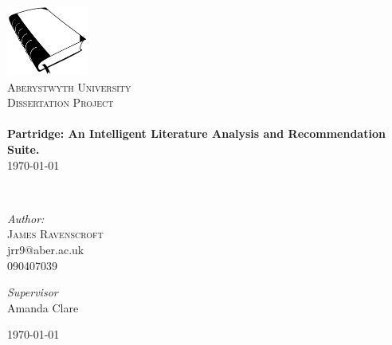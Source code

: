 \begin{titlepage}
 
\begin{center}
 
\includegraphics[width=0.20\textwidth]{../cover_logo.png}\\[1cm]
 
\textsc{\LARGE Aberystwyth University}\\[1.5cm]
 
\textsc{\LARGE Dissertation Project}\\[0.5cm]
 
 
\HRule \\[0.4cm]
{ \huge \bfseries Partridge: An Intelligent Literature Analysis and
Recommendation Suite.}\\[0.4cm]

\today
 
\HRule \\[1.5cm]

\begin{minipage}{0.4\textwidth}
\begin{flushleft} \large
\emph{Author:}\\
\textsc{James Ravenscroft}\\
jrr9@aber.ac.uk\\
090407039 
\end{flushleft}
\end{minipage}
\begin{minipage}{0.4\textwidth}
\begin{flushright} \large
\emph{Supervisor} \\
Amanda Clare

\end{flushright}
\end{minipage}

\vfill
 
{\large \today}
 
\end{center}
 
\end{titlepage}

